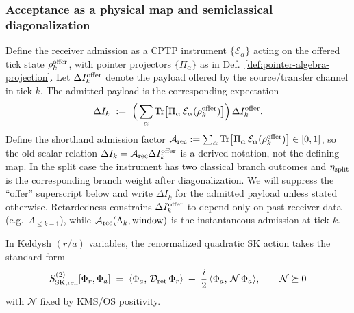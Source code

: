 \documentclass[10pt]{article}
\theoremstyle{definition}
\theoremstyle{plain}
\begin{document}
\subsubsection{Acceptance as a physical map and semiclassical diagonalization}
\label{subsubsec:acceptance-diagonalization}
Define the receiver admission as a CPTP instrument $\{\mathcal E_\alpha\}$ acting on the offered
tick state $\rho_k^{\rm offer}$, with pointer projectors $\{\Pi_\alpha\}$ as in
Def.~\ref{def:pointer-algebra-projection}. Let $\Delta I_k^{\rm offer}$ denote the payload offered
by the source/transfer channel in tick $k$. The admitted payload is the corresponding expectation
\begin{equation}
\Delta I_k\ :=\ \Big(\sum_\alpha \operatorname{Tr}\!\big[\Pi_\alpha\,\mathcal E_\alpha(\rho_k^{\rm offer})\big]\Big)\,
\Delta I_k^{\rm offer}.
\label{eq:admitted-payload}
\end{equation}
Define the shorthand admission factor
$\mathcal A_{\rm rec}:=\sum_\alpha \operatorname{Tr}\!\big[\Pi_\alpha\,\mathcal E_\alpha(\rho_k^{\rm offer})\big]\in[0,1]$,
so the old scalar relation $\Delta I_k=\mathcal A_{\rm rec}\Delta I_k^{\rm offer}$ is a derived notation,
not the defining map. In the split case the instrument has two classical branch outcomes and
$\eta_{\rm split}$ is the corresponding branch weight after diagonalization.
We will suppress the ``offer'' superscript below and write $\Delta I_k$ for the admitted payload unless stated otherwise.
Retardedness constrains $\Delta I_k^{\rm offer}$ to depend only on past receiver data (e.g.\ $\Lambda_{\le k-1}$),
while $\mathcal A_{\rm rec}(\Lambda_k,\text{window})$ is the instantaneous admission at tick $k$.

In Keldysh $(r/a)$ variables, the renormalized quadratic SK action takes the standard form
\begin{equation}
S^{(2)}_{\rm SK,ren}[\Phi_r,\Phi_a]
\;=\;\langle\Phi_a,\,\mathcal D_{\rm ret}\,\Phi_r\rangle
\; +\;\frac{i}{2}\,\langle\Phi_a,\,\mathcal N\,\Phi_a\rangle,
\qquad \mathcal N\succeq 0
\label{eq:SK-ra-quadratic}
\end{equation}
with $\mathcal N$ fixed by KMS/OS positivity.
\end{document}

